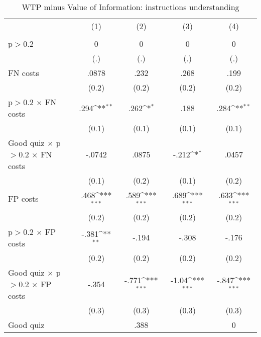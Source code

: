 \begin{table}[htbp]\centering
\def\sym#1{\ifmmode^{#1}\else\(^{#1}\)\fi}
\caption{WTP minus Value of Information: instructions understanding}
\begin{tabular}{l*{4}{c}}
\hline\hline
                &\multicolumn{1}{c}{(1)}&\multicolumn{1}{c}{(2)}&\multicolumn{1}{c}{(3)}&\multicolumn{1}{c}{(4)}\\
                &\multicolumn{1}{c}{}&\multicolumn{1}{c}{}&\multicolumn{1}{c}{}&\multicolumn{1}{c}{}\\
\hline
p$>$0.2         &        0         &        0         &        0         &        0         \\
                &      (.)         &      (.)         &      (.)         &      (.)         \\
FN costs        &    .0878         &     .232         &     .268         &     .199         \\
                &    (0.2)         &    (0.2)         &    (0.2)         &    (0.2)         \\
p$>$0.2 $\times$ FN costs&     .294\sym{**} &     .262\sym{*}  &     .188         &     .284\sym{**} \\
                &    (0.1)         &    (0.1)         &    (0.1)         &    (0.1)         \\
Good quiz $\times$ p$>$0.2 $\times$ FN costs&   -.0742         &    .0875         &    -.212\sym{*}  &    .0457         \\
                &    (0.1)         &    (0.2)         &    (0.1)         &    (0.2)         \\
FP costs        &     .468\sym{***}&     .589\sym{***}&     .689\sym{***}&     .633\sym{***}\\
                &    (0.2)         &    (0.2)         &    (0.2)         &    (0.2)         \\
p$>$0.2 $\times$ FP costs&    -.381\sym{**} &    -.194         &    -.308         &    -.176         \\
                &    (0.2)         &    (0.2)         &    (0.2)         &    (0.2)         \\
Good quiz $\times$ p$>$0.2 $\times$ FP costs&    -.354         &    -.771\sym{***}&    -1.04\sym{***}&    -.847\sym{***}\\
                &    (0.3)         &    (0.3)         &    (0.3)         &    (0.3)         \\
Good quiz       &                  &     .388         &                  &        0         \\

\end{tabular}
\end{table}
